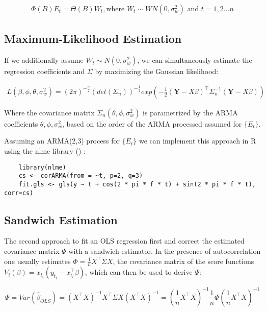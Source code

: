 \begin{gather*}
    \Phi(B)E_t = \Theta(B)W_t, \text{where $W_t \sim WN(0, \sigma_w^2)$ and $t = 1, 2 \dots n$}
\end{gather*}


\subsection{Maximum-Likelihood Estimation}

If we additionally assume $W_t \sim N(0, \sigma_w^2)$, we can simultaneously estimate the regression coefficients and $\Sigma$ by
maximizing the Gaussian likelihood:

\begin{gather*}
    L(\beta, \phi, \theta, \sigma_w^2) = (2 \pi)^{-\frac{n}{2}} (det(\Sigma_n))^{-\frac{1}{2}} exp(-\frac{1}{2}
    (\mathbf{Y}-X\beta)^{\top} \Sigma_n^{-1}(\mathbf{Y}-X\beta))
\end{gather*}

Where the covariance matrix $\Sigma_n(\theta, \phi, \sigma_w^2)$ is parametrized by the ARMA coefficients $\theta, \phi, \sigma_w^2$,
based on the order of the ARMA processed assumed for $\{E_t\}$.


Assuming an ARMA(2,3) process for $\{E_t\}$ we can implement this approach in R using the nlme library (\citeauthor{box_time_1994})
:
\begin{verbatim}
    library(nlme)
    cs <- corARMA(from = ~t, p=2, q=3)
    fit.gls <- gls(y ~ t + cos(2 * pi * f * t) + sin(2 * pi * f * t), corr=cs)
\end{verbatim}


\subsection{Sandwich Estimation}
The second approach to fit an OLS regression first and correct the estimated covariance matrix $\Psi$ with a
sandwich estimator.
In the presence of autocorrelation one usually estimates $\Phi = \frac{1}{n} X^{\top} \Sigma X$,
the covariance matrix of the score functions
$V_i(\beta) = x_{t_i}(y_{t_i} - x_{t_i}^{\top}\beta)$, which can then be used to derive $\Psi$:

\begin{equation}\label{eq:sandwich}
\Psi = Var(\hat \beta_{OLS}) = (X^{\top} X)^{-1} X^{\top} \Sigma X (X^{\top}X)^{-1} =
(\frac{1}{n} X^{\top} X)^{-1} \frac{1}{n} \Phi (\frac{1}{n} X^{\top} X)^{-1}
\end{equation}

